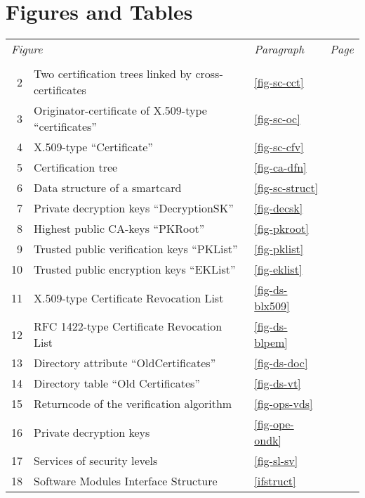 \section*{Figures and Tables}

\begin {center}
\begin {tabular}{rllr}
\multicolumn{2}{l}{\em Figure}&{\em Paragraph}&\multicolumn{1}{l}{\em Page}\\
 & & & \\
  2 & Two certification trees linked by cross-certificates
& \ref{fig-sc-cct} & \pageref{fig-sc-cct}
\\
 3 & Originator-certificate of X.509-type ``certificates''
& \ref{fig-sc-oc} & \pageref{fig-sc-oc}
\\
 4 & X.509-type ``Certificate''
& \ref{fig-sc-cfv} & \pageref{fig-sc-cfv}
\\
 5 & Certification tree
& \ref{fig-ca-dfn} & \pageref{fig-ca-dfn}
\\
 6 & Data structure of a smartcard
& \ref{fig-sc-struct} & \pageref{fig-sc-struct}
\\
 7 & Private decryption keys ``DecryptionSK''
& \ref{fig-decsk} & \pageref{fig-decsk}
\\
 8 & Highest public CA-keys ``PKRoot''
& \ref{fig-pkroot} & \pageref{fig-pkroot}
\\
 9 & Trusted  public verification keys ``PKList''
& \ref{fig-pklist} & \pageref{fig-pklist}
\\
10 & Trusted public encryption keys ``EKList''
& \ref{fig-eklist} & \pageref{fig-eklist}
\\
11 & X.509-type Certificate Revocation List
& \ref{fig-ds-blx509} & \pageref{fig-ds-blx509}
\\
12 & RFC 1422-type Certificate Revocation List
& \ref{fig-ds-blpem} & \pageref{fig-ds-blpem}
\\
13 & Directory attribute ``OldCertificates''
& \ref{fig-ds-doc} & \pageref{fig-ds-doc}
\\
14 & Directory table ``Old Certificates''
& \ref{fig-ds-vt} & \pageref{fig-ds-vt}
\\
15 & Returncode of the verification algorithm
& \ref{fig-ops-vds} & \pageref{fig-ops-vds}
\\
16 & Private decryption keys
& \ref{fig-ope-ondk} & \pageref{fig-ope-ondk}
\\
17 & Services of security levels
& \ref{fig-sl-sv} & \pageref{fig-sl-sv}
\\
18 & Software Modules Interface Structure
& \ref{ifstruct} & \pageref{ifstruct}

\end {tabular}
\end {center}
